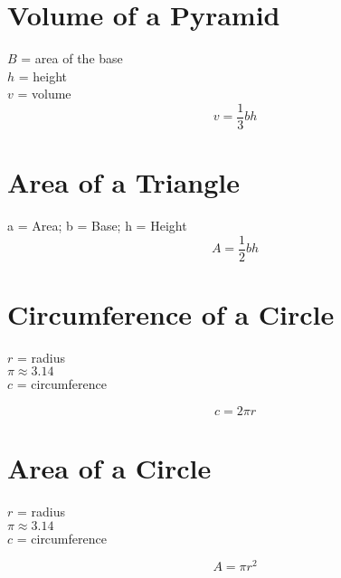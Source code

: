 \section{Volume of a Pyramid}

\noindent $B$ = area of the base\\
$h$ = height\\
$v$ = volume
\begin{equation*}
  v = \frac{1}{3}bh
\end{equation*}


\section{Area of a Triangle}

\noindent a = Area; b = Base; h = Height
\begin{equation*}
  A = \frac{1}{2}bh
\end{equation*}


\section{Circumference of a Circle}

\noindent $r$ = radius\\
$\pi \approx 3.14$\\
$c$ = circumference

\begin{equation*}
  c = 2 \pi r
\end{equation*}


\section{Area of a Circle}

\noindent $r$ = radius\\
$\pi \approx 3.14$\\
$c$ = circumference

\begin{equation*}
  A = \pi r^2
\end{equation*}

